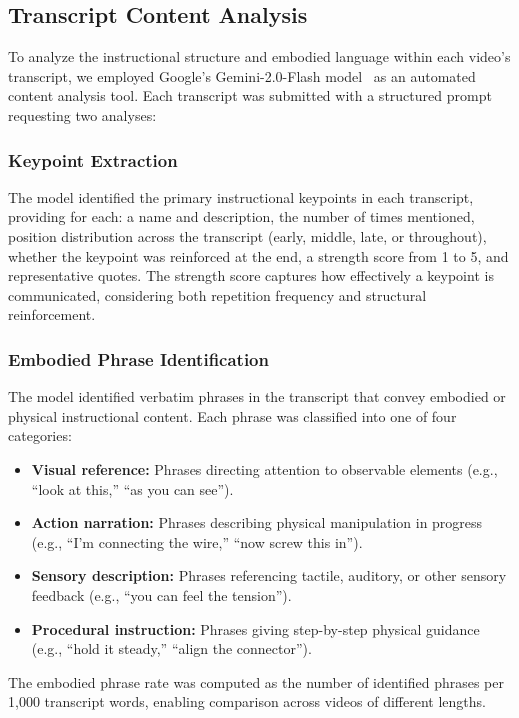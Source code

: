 \subsection{Transcript Content Analysis}

To analyze the instructional structure and embodied language within each video's transcript, we employed Google's Gemini-2.0-Flash model~\cite{gemini2024} as an automated content analysis tool. Each transcript was submitted with a structured prompt requesting two analyses:

\subsubsection{Keypoint Extraction}
The model identified the primary instructional keypoints in each transcript, providing for each: a name and description, the number of times mentioned, position distribution across the transcript (early, middle, late, or throughout), whether the keypoint was reinforced at the end, a strength score from 1 to 5, and representative quotes. The strength score captures how effectively a keypoint is communicated, considering both repetition frequency and structural reinforcement.

\subsubsection{Embodied Phrase Identification}
The model identified verbatim phrases in the transcript that convey embodied or physical instructional content. Each phrase was classified into one of four categories:
\begin{itemize}
    \item \textbf{Visual reference:} Phrases directing attention to observable elements (e.g., ``look at this,'' ``as you can see'').
    \item \textbf{Action narration:} Phrases describing physical manipulation in progress (e.g., ``I'm connecting the wire,'' ``now screw this in'').
    \item \textbf{Sensory description:} Phrases referencing tactile, auditory, or other sensory feedback (e.g., ``you can feel the tension'').
    \item \textbf{Procedural instruction:} Phrases giving step-by-step physical guidance (e.g., ``hold it steady,'' ``align the connector'').
\end{itemize}

\noindent The embodied phrase rate was computed as the number of identified phrases per 1{,}000 transcript words, enabling comparison across videos of different lengths.

